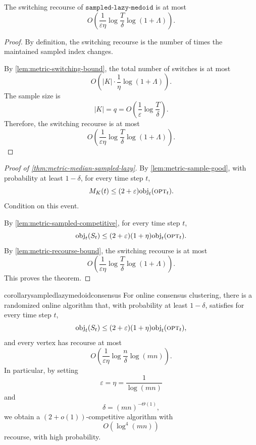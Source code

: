 \begin{lemma}
\label{lem:metric-recourse-bound}
The switching recourse of \(\texttt{sampled-lazy-medoid}\) is at most
\[
    O\left(
        \frac{1}{\varepsilon\eta}
        \log\frac{T}{\delta}
        \log(1+\Lambda)
    \right).
\]
\end{lemma}

\begin{proof}
By definition, the switching recourse is the number of times the maintained sampled index changes.

By \cref{lem:metric-switching-bound}, the total number of switches is at most
\[
    O\left(
        |K|\cdot
        \frac{1}{\eta}
        \log(1+\Lambda)
    \right).
\]
The sample size is
\[
    |K|
    =
    q
    =
    O\left(
        \frac{1}{\varepsilon}
        \log\frac{T}{\delta}
    \right).
\]
Therefore, the switching recourse is at most
\[
    O\left(
        \frac{1}{\varepsilon\eta}
        \log\frac{T}{\delta}
        \log(1+\Lambda)
    \right).
\]
\end{proof}

\begin{proof}[Proof of \cref{thm:metric-median-sampled-lazy}]
By \cref{lem:metric-sample-good}, with probability at least \(1-\delta\), for every time step \(t\),
\[
    M_K(t)
    \le
    (2+\varepsilon)\text{obj}_t(\textsc{opt}_t).
\]
Condition on this event.

By \cref{lem:metric-sampled-competitive}, for every time step \(t\),
\[
    \text{obj}_t(S_t)
    \le
    (2+\varepsilon)(1+\eta)\text{obj}_t(\textsc{opt}_t).
\]
By \cref{lem:metric-recourse-bound}, the switching recourse is at most
\[
    O\left(
        \frac{1}{\varepsilon\eta}
        \log\frac{T}{\delta}
        \log(1+\Lambda)
    \right).
\]
This proves the theorem.
\end{proof}

\begin{restatable}{corollary}{sampledlazymedoidconsensus}
\label{cor:sampled-lazy-consensus}
For online consensus clustering, there is a randomized online algorithm that, with probability at least \(1-\delta\), satisfies for every time step \(t\),
\[
    \text{obj}_t(S_t)
    \le
    (2+\varepsilon)(1+\eta)\text{obj}_t(\textsc{opt}_t),
\]
and every vertex has recourse at most
\[
    O\left(
        \frac{1}{\varepsilon\eta}
        \log\frac{n}{\delta}
        \log(mn)
    \right).
\]
In particular, by setting
\[
    \varepsilon=\eta=\frac{1}{\log(mn)}
\]
and
\[
    \delta=(mn)^{-\Theta(1)},
\]
we obtain a \((2+o(1))\)-competitive algorithm with
\[
    O(\log^4(mn))
\]
recourse, with high probability.
\end{restatable}

